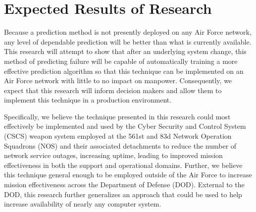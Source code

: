 \section{Expected Results of Research}
Because a prediction method is not presently deployed on any Air Force network,
any level of dependable prediction will be better than what is currently
available.  This research will attempt to show that after an underlying system
change, this method of predicting failure will be capable of automatically
training a more effective prediction algorithm so that this technique can be
implemented on an Air Force network with little to no impact on manpower.
Consequently, we expect that this research will inform decision makers and
allow them to implement this technique in a production environment.

Specifically, we believe the technique presented in this research could most
effectively be implemented and used by the Cyber Security and Control System
(CSCS) weapon system employed at the 561st and 83d Network Operation Squadrons
(NOS) and their associated detachments to reduce the number of network service
outages, increasing uptime, leading to improved mission effectiveness in both
the support and operational domains.  Further, we believe this technique
general enough to be employed outside of the Air Force to increase mission
effectiveness across the Department of Defense (DOD).  External to the DOD,
this research further generalizes an approach that could be used to help
increase availability of nearly any computer system.
